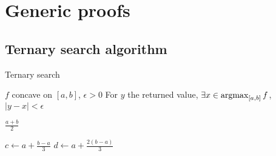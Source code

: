 \section{Generic proofs}

\subsection{Ternary search algorithm}
\label{sec:ternary_search_algorithm}

\begin{algorithm}[H]
    \caption{Ternary search}
    \begin{algorithmic}[1]
    \Require $f$ concave on $[a, b]$, $\epsilon > 0$
    \Ensure For $y$ the returned value, $\exists x \in \operatorname*{argmax}_{[a, b]} f$, $|y - x| < \epsilon$
    

        \State \Return $\frac{a + b}{2}$
    \EndIf
    
    \State $c \leftarrow a + \frac{b - a}{3}$
    \State $d \leftarrow a + \frac{2(b - a)}{3}$
    
        \State \Return {}
    \Else
        \State \Return {}
    \EndIf
    \EndFunction
    
    \end{algorithmic}
\end{algorithm}


